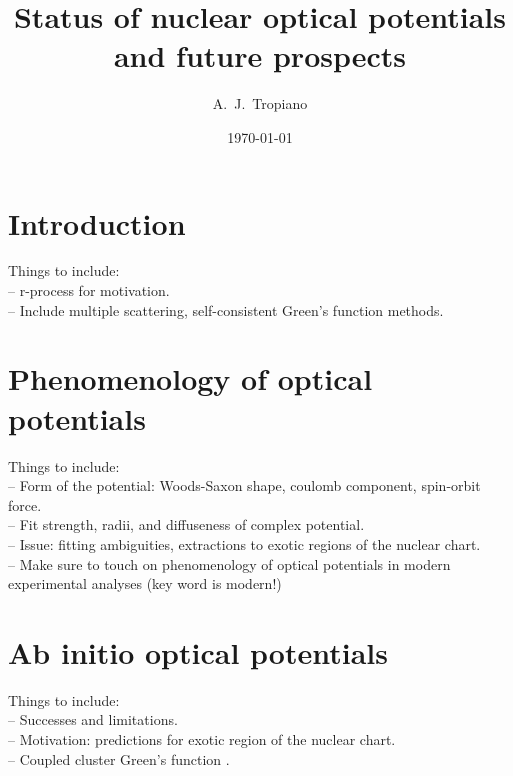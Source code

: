 \documentclass[preprintnumbers,floatfix,aps,prc,preprint,nofootinbib]{revtex4-1}
\begin{document}
\title{Status of nuclear optical potentials and future prospects}


\author{A.~J.~Tropiano}


\date{\today}

\maketitle

\newpage


\section{Introduction}
\label{sec:intro}


Things to include:
\\
-- r-process for motivation.
\\
-- Include multiple scattering, self-consistent Green's function methods.


\section{Phenomenology of optical potentials}
\label{sec:section_2}


Things to include:
\\
-- Form of the potential: Woods-Saxon shape, coulomb component, spin-orbit force.
\\
-- Fit strength, radii, and diffuseness of complex potential.
\\
-- Issue: fitting ambiguities, extractions to exotic regions of the nuclear chart.
\\
-- Make sure to touch on phenomenology of optical potentials in modern experimental analyses (key word is modern!)



\section{Ab initio optical potentials}
\label{sec:section_3}


Things to include:
\\
-- Successes and limitations.
\\
-- Motivation: predictions for exotic region of the nuclear chart.
\\
-- Coupled cluster Green's function \cite{Rotureau:2016jpf}.
\end{document}
